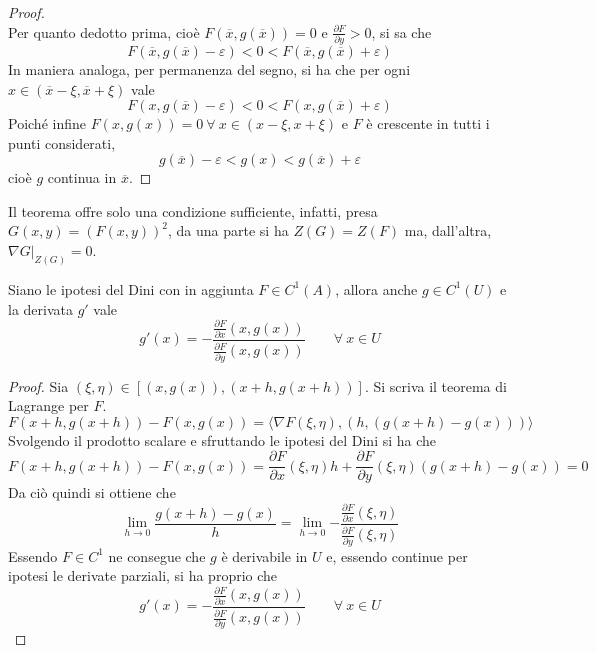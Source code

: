 \begin{proof}
\begin{equation}
       \end{equation}
       Per quanto dedotto prima, cioè $F(\overline{x}, g(\overline{x}))=0$ e $\frac{\partial{F}}{\partial{y}}>0$, si sa che 
       \begin{equation}
           F(\overline{x}, g(\overline{x})-\varepsilon)<0<F(\overline{x}, g(\overline{x})+\varepsilon)
       \end{equation}
       In maniera analoga, per permanenza del segno, si ha che per ogni $x \in (\overline{x}-\xi, \overline{x}+\xi)$ vale
       \begin{equation}
           F(x, g(\overline{x})-\varepsilon)<0<F(x, g(\overline{x})+\varepsilon)
       \end{equation}
       Poiché infine $F(x, g(x))=0\ \forall\ x \in (x-\xi, x+\xi)$ e $F$ è crescente in tutti i punti considerati,
       \begin{equation}
           g(\overline{x})- \varepsilon < g(x) < g(\overline{x})+\varepsilon
       \end{equation}
       cioè $g$ continua in $\overline{x}$.
       \end{proof}
\begin{oss}
    Il teorema offre solo una condizione sufficiente, infatti, presa $G(x,y)=(F(x,y))^2$, da una parte si ha $Z(G)=Z(F)$ ma, dall'altra, $\nabla G \big|_{Z(G)}=0$.
\end{oss}
\begin{theorem}
Siano le ipotesi del Dini con in aggiunta $F \in C^1(A)$, allora anche $g \in C^1(U)$ e la derivata $g'$ vale
\begin{equation}
    g'(x)=-\frac{\frac{\partial{F}}{\partial{x}}(x, g(x))}{\frac{\partial{F}}{\partial{y}}(x, g(x))} \qquad \forall\ x \in U
\end{equation}
\end{theorem}
\begin{proof}
Sia $(\xi, \eta) \in \left[(x, g(x)), (x+h, g(x+h)) \right]$.
Si scriva il teorema di Lagrange per $F$.
\begin{equation}
    F(x+h, g(x+h))-F(x, g(x)) =\langle \nabla F (\xi, \eta), (h, (g(x+h)-g(x))) \rangle
\end{equation}
Svolgendo il prodotto scalare e sfruttando le ipotesi del Dini si ha che
\begin{equation}
    F(x+h, g(x+h))-F(x, g(x))= \frac{\partial {F}}{\partial{x}}(\xi, \eta) h + \frac{\partial {F}}{\partial{y}}(\xi, \eta) (g(x+h)-g(x))=0
\end{equation}
    Da ciò quindi si ottiene che
    \begin{equation}
        \lim_{h \to 0}{\frac{g(x+h)-g(x)}{h}}=\lim_{h \to 0}{-\frac{\frac{\partial {F}}{\partial{x}}(\xi, \eta)}{\frac{\partial {F}}{\partial{y}}(\xi, \eta)}}
    \end{equation}
Essendo $F \in C^1$ ne consegue che $g$ è derivabile in $U$ e, essendo continue per ipotesi le derivate parziali, si ha proprio che
\begin{equation}
    g'(x)=-\frac{\frac{\partial{F}}{\partial{x}}(x, g(x))}{\frac{\partial{F}}{\partial{y}}(x, g(x))} \qquad \forall\ x \in U
\end{equation}
\end{proof}
